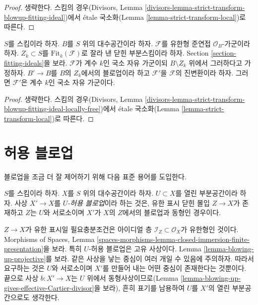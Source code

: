 \begin{proof}
생략한다. 스킴의 경우(Divisors, Lemma
\ref{divisors-lemma-strict-transform-blowup-fitting-ideal})에서 \'etale
국소화(Lemma \ref{lemma-strict-transform-local})로 따른다.
\end{proof}

\begin{lemma}
\label{lemma-strict-transform-blowup-fitting-ideal-locally-free}
$S$를 스킴이라 하자. $B$를 $S$ 위의 대수공간이라 하자.
$\mathcal{F}$를 유한형 준연접 $\mathcal{O}_B$-가군이라 하자.
$Z_k \subset S$를 $\text{Fit}_k(\mathcal{F})$로 잘라 낸 닫힌
부분스킴이라 하자. Section \ref{section-fitting-ideals}을 보라.
$\mathcal{F}$가 계수 $k$인 국소 자유 가군이되 $B \setminus Z_k$ 위에서 그러하다고
가정하자. $B' \to B$를 $B$의 $Z_k$에서의 블로업이라 하고
$\mathcal{F}'$을 $\mathcal{F}$의 진변환이라 하자.
그러면 $\mathcal{F}'$은 계수 $k$인 국소 자유 가군이다.
\end{lemma}

\begin{proof}
생략한다. 스킴의 경우(Divisors, Lemma
\ref{divisors-lemma-strict-transform-blowup-fitting-ideal-locally-free})에서
\'etale 국소화(Lemma \ref{lemma-strict-transform-local})로 따른다.
\end{proof}

\section{허용 블로업}
\label{section-admissible-blowups}

\noindent
블로업을 조금 더 잘 제어하기 위해 다음 표준 용어를 도입한다.

\begin{definition}
\label{definition-admissible-blowup}
$S$를 스킴이라 하자. $X$를 $S$ 위의 대수공간이라 하자.
$U \subset X$를 열린 부분공간이라 하자. 사상 $X' \to X$를
{\it $U$-허용 블로업}이라 하는 것은, 유한 표시 닫힌 몰입
$Z \to X$가 존재하고 $Z$는 $U$와 서로소이며
$X'$가 $X$의 $Z$에서의 블로업과 동형인 경우이다.
\end{definition}

\noindent
$Z \to X$가 유한 표시일 필요충분조건은 아이디얼 층
$\mathcal{I}_Z \subset \mathcal{O}_X$가 유한형인 것이다. Morphisms of
Spaces, Lemma
\ref{spaces-morphisms-lemma-closed-immersion-finite-presentation}을 보라.
특히 $U$-허용 블로업은 고유 사상이다. Lemma
\ref{lemma-blowing-up-projective}를 보라.
같은 사상을 낳는 중심이 여러 개일 수 있음에 주의하자. 따라서 요구하는
것은 $U$와 서로소이며 $X'$를 만들어 내는 어떤 중심이 존재한다는 것뿐이다.
끝으로 사상 $b : X' \to X$는 $U$ 위에서 동형사상이므로(Lemma
\ref{lemma-blowing-up-gives-effective-Cartier-divisor}을 보라), 흔히
표기를 남용하여 $U$를 $X'$의 열린 부분공간으로도 생각한다.

